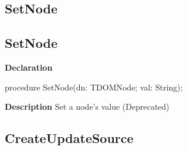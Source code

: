 \documentclass{report}
\newif\ifpdf
\begin{document}
\subsection*{\large{\textbf{SetNode}}\normalsize\hspace{1ex}\hrulefill}
\else
\subsection*{SetNode}
\fi
\label{ipkbuild-SetNode}
\begin{list}{}{
\setlength{\itemindent}{0cm}
\setlength{\listparindent}{0cm}
\setlength{\leftmargin}{\evensidemargin}
\addtolength{\leftmargin}{\tmplength}
\settowidth{\labelsep}{X}
\addtolength{\leftmargin}{\labelsep}
\setlength{\labelwidth}{\tmplength}
}
\item[\textbf{Declaration}\hfill]
\ifpdf
\begin{flushleft}
\fi
\begin{ttfamily}
procedure SetNode(dn: TDOMNode; val: String);\end{ttfamily}

\ifpdf
\end{flushleft}
\fi

\par
\item[\textbf{Description}]
Set a node's value (Deprecated)

\end{list}
\ifpdf
\subsection*{\large{\textbf{CreateUpdateSource}}\normalsize\hspace{1ex}\hrulefill}
\else
\end{document}
